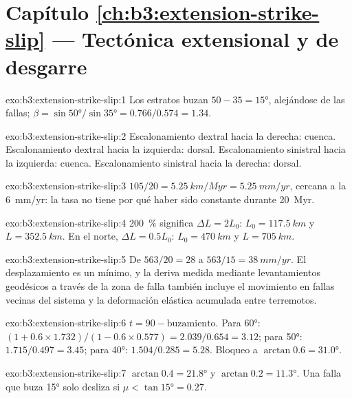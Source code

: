 \section*{Capítulo \ref{ch:b3:extension-strike-slip} --- Tectónica extensional y de desgarre}

\begin{solution}{exo:b3:extension-strike-slip:1}
Los estratos buzan $50 - 35 = \ang{15}$, alejándose de las fallas; $\beta =
\sin\ang{50}/\sin\ang{35} = 0.766/0.574 = 1.34$.
\end{solution}

\begin{solution}{exo:b3:extension-strike-slip:2}
Escalonamiento dextral hacia la derecha: cuenca. Escalonamiento dextral hacia la izquierda: dorsal. Escalonamiento sinistral
hacia la izquierda: cuenca. Escalonamiento sinistral hacia la derecha: dorsal.
\end{solution}

\begin{solution}{exo:b3:extension-strike-slip:3}
$105/20 = \qty{5.25}{km/Myr} = \qty{5.25}{mm/yr}$, cercana a la
\qty{6}{mm/yr}: la tasa no tiene por qué haber sido constante durante \qty{20}{Myr}.
\end{solution}

\begin{solution}{exo:b3:extension-strike-slip:4}
\qty{200}{\percent} significa $\Delta L = 2L_0$: $L_0 = \qty{117.5}{km}$ y $L
= \qty{352.5}{km}$. En el norte, $\Delta L = 0.5L_0$: $L_0 = \qty{470}{km}$
y $L = \qty{705}{km}$.
\end{solution}

\begin{solution}{exo:b3:extension-strike-slip:5}
De $563/20 = 28$ a $563/15 = \qty{38}{mm/yr}$. El desplazamiento es un mínimo, y
la deriva medida mediante levantamientos geodésicos a través de la zona de falla también incluye el movimiento en
fallas vecinas del sistema y la deformación elástica acumulada entre
terremotos.
\end{solution}

\begin{solution}{exo:b3:extension-strike-slip:6}
$t = 90 - \text{buzamiento}$. Para \ang{60}: $(1 + 0.6\times1.732)/(1 - 0.6\times
0.577) = 2.039/0.654 = 3.12$; para \ang{50}: $1.715/0.497 = 3.45$; para
\ang{40}: $1.504/0.285 = 5.28$. Bloqueo a $\arctan0.6 = \ang{31.0}$.
\end{solution}

\begin{solution}{exo:b3:extension-strike-slip:7}
$\arctan0.4 = \ang{21.8}$ y $\arctan0.2 = \ang{11.3}$. Una falla que buza
\ang{15} solo desliza si $\mu < \tan\ang{15} = 0.27$.
\end{solution}


